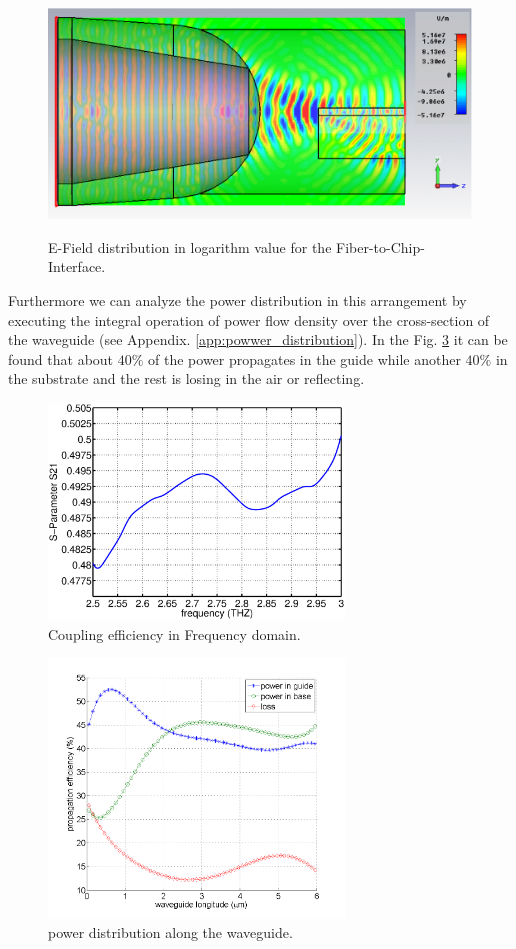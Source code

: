 \begin{figure}[!ht]
\centering
	\includegraphics[width=0.7 \textwidth]{bilder/cst_basic_waveguide_efield}
	\label{fig:coupling_e_field}
	\caption{E-Field distribution in logarithm value for the Fiber-to-Chip-Interface.}
\end{figure}
Furthermore we can analyze the power distribution in this arrangement by executing the integral operation of power flow density over the cross-section of the waveguide (see Appendix. \ref{app:powwer_distribution}).  In the Fig. \ref{fig:power_distribution} it can be found that about $40\%$ of the power propagates in the guide while another $40\%$ in the substrate and the rest is losing in the air or reflecting.
\begin{figure}
\centering
\includegraphics[width=0.7\textwidth]{bilder/original_coupling_efficiency}
\caption{Coupling efficiency in Frequency domain.}
\label{fig:orignial_coupling_efficiency}
\end{figure}
\begin{figure}[!ht]
\centering
\includegraphics[width=0.7\textwidth]{bilder/power_distribution1}
\caption{power distribution along the waveguide.}
\label{fig:power_distribution}
\end{figure}
